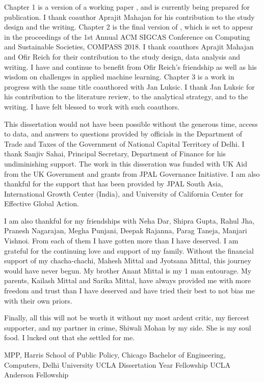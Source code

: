 {Chapter 1 is a version of a working paper \cite{mittal2017vat}, and is currently being prepared for publication. I thank coauthor Aprajit Mahajan for his contribution to the study design and the writing. Chapter 2 is the final version of \cite{mittal2018bogus}, which is set to appear in the proceedings of the 1st Annual ACM SIGCAS Conference on Computing and Sustainable Societies, COMPASS 2018. I thank coauthors Aprajit Mahajan and Ofir Reich for their contribution to the study design, data analysis and writing. I have and continue to benefit from Ofir Reich's friendship as well as his wisdom on challenges in applied machine learning. Chapter 3 is a work in progress with the same title coauthored with Jan Luksic. I thank Jan Luksic for his contribution to the literature review, to the analytical strategy, and to the writing. I have felt blessed to work with such coauthors.

This dissertation would not have been possible without the generous time, access to data, and answers to questions provided by officials in the Department of Trade and Taxes of the Government of National Capital Territory of Delhi. I thank Sanjiv Sahai, Principal Secretary, Department of Finance for his undiminishing support. The work in this disseration was funded with UK Aid from the UK Government and grants from JPAL Governance Initiative. I am also thankful for the support that has been provided by JPAL South Asia, International Growth Center (India), and University of California Center for Effective Global Action.

I am also thankful for my friendships with Neha Dar, Shipra Gupta, Rahul Jha, Pranesh Nagarajan, Megha Punjani, Deepak Rajanna, Parag Taneja, Manjari Vishnoi. From each of them I have gotten more than I have deserved. I am grateful for the continuing love and support of my family. Without the financial support of my chacha-chachi, Mahesh Mittal and Jyotsana Mittal, this journey would have never begun. My brother Anant Mittal is my 1 man entourage. My parents, Kailash Mittal and Sarika Mittal, have always provided me with more freedom and trust than I have deserved and have tried their best to not bias me with their own priors. 

Finally, all this will not be worth it without my most ardent critic, my fiercest supporter, and my partner in crime, Shiwali Mohan by my side. She is my soul food. I lucked out that she settled for me.}
 {}
 {MPP, Harris School of Public Policy, Chicago}
 {Bachelor of Engineering, Computers, Delhi University}
 {}
 {UCLA Dissertation Year Fellowship}
 {UCLA Anderson Fellowship\vspace{0.8cm}}

